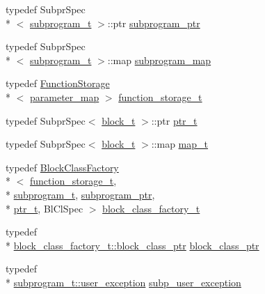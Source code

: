 \begin{DoxyCompactItemize}
\item 
typedef Subpr\-Spec\\*
$<$ \hyperlink{classLIBKMS__namespace_1_1Block_a89ead8d5558038ca06b862f1988c3d1a}{subprogram\-\_\-t} $>$\-::ptr \hyperlink{classLIBKMS__namespace_1_1Block_aa267fa3009a53828cb55cd853ff4c1b6}{subprogram\-\_\-ptr}
\item 
typedef Subpr\-Spec\\*
$<$ \hyperlink{classLIBKMS__namespace_1_1Block_a89ead8d5558038ca06b862f1988c3d1a}{subprogram\-\_\-t} $>$\-::map \hyperlink{classLIBKMS__namespace_1_1Block_af6ad7e673cbb2f16fe125605494e67fb}{subprogram\-\_\-map}
\item 
typedef \hyperlink{classLIBKMS__namespace_1_1FunctionStorage}{Function\-Storage}\\*
$<$ \hyperlink{classLIBKMS__namespace_1_1Block_a8d67012b101494c21dee73cd82a1e99f}{parameter\-\_\-map} $>$ \hyperlink{classLIBKMS__namespace_1_1Block_a2776c98e95ec6726f062516f0a0cf496}{function\-\_\-storage\-\_\-t}
\item 
typedef Subpr\-Spec$<$ \hyperlink{classLIBKMS__namespace_1_1Block_ae33d301121e149f8c7cc9a19f7046237}{block\-\_\-t} $>$\-::ptr \hyperlink{classLIBKMS__namespace_1_1Block_a85039a495a9c40a4425de6a5291decbe}{ptr\-\_\-t}
\item 
typedef Subpr\-Spec$<$ \hyperlink{classLIBKMS__namespace_1_1Block_ae33d301121e149f8c7cc9a19f7046237}{block\-\_\-t} $>$\-::map \hyperlink{classLIBKMS__namespace_1_1Block_aedba90f9127d999f41d7d397e691e081}{map\-\_\-t}
\item 
typedef \hyperlink{classLIBKMS__namespace_1_1BlockClassFactory}{Block\-Class\-Factory}\\*
$<$ \hyperlink{classLIBKMS__namespace_1_1Block_a2776c98e95ec6726f062516f0a0cf496}{function\-\_\-storage\-\_\-t}, \\*
\hyperlink{classLIBKMS__namespace_1_1Block_a89ead8d5558038ca06b862f1988c3d1a}{subprogram\-\_\-t}, \hyperlink{classLIBKMS__namespace_1_1Block_aa267fa3009a53828cb55cd853ff4c1b6}{subprogram\-\_\-ptr}, \\*
\hyperlink{classLIBKMS__namespace_1_1Block_a85039a495a9c40a4425de6a5291decbe}{ptr\-\_\-t}, Bl\-Cl\-Spec $>$ \hyperlink{classLIBKMS__namespace_1_1Block_abbc80ab417de8b644b70879fe6e330f5}{block\-\_\-class\-\_\-factory\-\_\-t}
\item 
typedef \\*
\hyperlink{classLIBKMS__namespace_1_1BlockClassFactory_a882880cb8a33fcc808b41e283cea2dc3}{block\-\_\-class\-\_\-factory\-\_\-t\-::block\-\_\-class\-\_\-ptr} \hyperlink{classLIBKMS__namespace_1_1Block_ae813a32e603fb01d7e86ef4afcdc91ae}{block\-\_\-class\-\_\-ptr}
\item 
typedef \\*
\hyperlink{structLIBKMS__namespace_1_1Subprogram_1_1user__exception}{subprogram\-\_\-t\-::user\-\_\-exception} \hyperlink{classLIBKMS__namespace_1_1Block_abd8589c23dd87cd24c96cf2d1a7c9d71}{subp\-\_\-user\-\_\-exception}
\end{DoxyCompactItemize}
